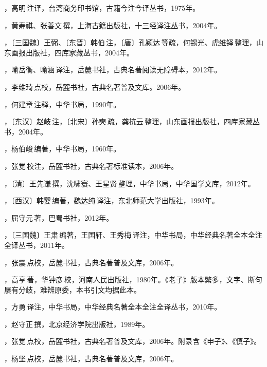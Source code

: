 ，高明\,注译，台湾商务印书馆，古籍今注今译丛书，1975年。

，黄寿祺、张善文\,撰，上海古籍出版社，十三经译注丛书，2004年。

，〔三国魏〕王弼、〔东晋〕韩伯\,注，〔唐〕孔颖达\,等疏，何锡光、虎维铎\,整理，山东画报出版社，四库家藏丛书，2004年。

，喻岳衡、喻涵\,译注，岳麓书社，古典名著阅读无障碍本，2012年。

，李维琦\,点校，岳麓书社，古典名著普及文库。2006年。

，何建章\,注释，中华书局，1990年。

，〔东汉〕赵岐\,注，〔北宋〕孙奭\,疏，龚抗云\,整理，山东画报出版社，四库家藏丛书，2004年。

，杨伯峻\,编著，中华书局，1960年。

，张觉\,校注，岳麓书社，古典名著标准读本，2006年。

，〔清〕王先谦\,撰，沈啸寰、王星贤\,整理，中华书局，中华国学文库，2012年。

，〔西汉〕韩婴\,编著，魏达纯\,译注，东北师范大学出版社，1993年。

，屈守元\,著，巴蜀书社，2012年。

，〔三国魏〕王肃\,编著，王国轩、王秀梅\,译注，中华书局，中华经典名著全本全注全译丛书，2011年。

，张震\,点校，岳麓书社，古典名著普及文库，2006年。

，高亨\,著，华钟彦\,校，河南人民出版社，1980年。《老子》版本繁多，文字、断句屡有分歧，难辨原委，本书引文均据此本。

，方勇\,译注，中华书局，中华经典名著全本全注全译丛书，2010年。

，赵守正\,撰，北京经济学院出版社，1989年。

，张觉\,点校，岳麓书社，古典名著普及文库，2006年。附录含《申子》、《慎子》。

，杨坚\,点校，岳麓书社，古典名著普及文库，2006年。

